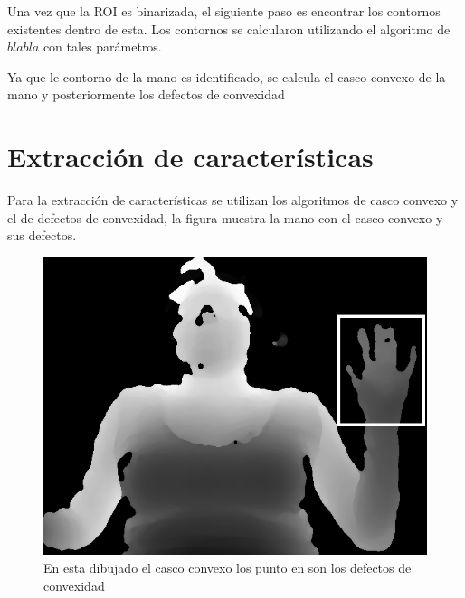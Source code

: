 
Una vez que la ROI es binarizada, el siguiente paso es encontrar los contornos existentes dentro de esta. Los contornos se calcularon utilizando el algoritmo de $blabla$ con tales parámetros.  

Ya que le contorno de la mano es identificado, se calcula el casco convexo de la mano y posteriormente los defectos de convexidad 

\section{Extracci\'on de caracter\'isticas}\label{sec:ExtraccionCaracteristicasSystem}

Para la extracción de características se utilizan los algoritmos de casco convexo y el de defectos de convexidad, la figura muestra la mano con el casco convexo y sus defectos. 

\begin{figure}[!h]
\begin{center}
\includegraphics[scale=.5]{./Figures/roi.png}
\end{center}
\caption{En esta dibujado el casco convexo los punto en son los defectos de convexidad}
\label{fig:Convex&Defects}
\end{figure}


